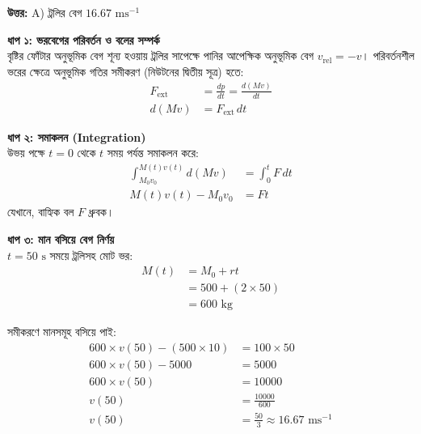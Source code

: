 \documentclass[12pt, a4paper]{article}
\begin{document}
\vspace{0.5em}
\begin{tcolorbox}[answerbox]
    \textbf{\color{success} উত্তর:} A) ট্রলির বেগ $16.67\text{ ms}^{-1}$
\end{tcolorbox}
\vspace{1em}

\begin{tcolorbox}[solutionbox={সমাধান (Solution)}]
    \noindent
    \textbf{ধাপ ১: ভরবেগের পরিবর্তন ও বলের সম্পর্ক} \\
    বৃষ্টির ফোঁটার অনুভূমিক বেগ শূন্য হওয়ায় ট্রলির সাপেক্ষে পানির আপেক্ষিক অনুভূমিক বেগ $v_{\text{rel}} = -v$। পরিবর্তনশীল ভরের ক্ষেত্রে অনুভূমিক গতির সমীকরণ (নিউটনের দ্বিতীয় সূত্র) হতে:
    \begin{align*}
        F_{\text{ext}} &= \frac{dp}{dt} = \frac{d(M v)}{dt} \\
        d(M v) &= F_{\text{ext}} \, dt
    \end{align*}
    
    \vspace{0.5em}
    \noindent\textbf{ধাপ ২: সমাকলন (Integration)} \\
    উভয় পক্ষে $t=0$ থেকে $t$ সময় পর্যন্ত সমাকলন করে:
    \begin{align*}
        \int_{M_0 v_0}^{M(t) v(t)} d(M v) &= \int_0^t F \, dt \\
        M(t) v(t) - M_0 v_0 &= F t
    \end{align*}
    যেখানে, বাহ্যিক বল $F$ ধ্রুবক।
    
    \vspace{0.5em}
    \noindent\textbf{ধাপ ৩: মান বসিয়ে বেগ নির্ণয়} \\
    $t = 50\text{ s}$ সময়ে ট্রলিসহ মোট ভর:
    \begin{align*}
        M(t) &= M_0 + r t \\
             &= 500 + (2 \times 50) \\
             &= 600\text{ kg}
    \end{align*}
    
    সমীকরণে মানসমূহ বসিয়ে পাই:
    \begin{align*}
        600 \times v(50) - (500 \times 10) &= 100 \times 50 \\
        600 \times v(50) - 5000 &= 5000 \\
        600 \times v(50) &= 10000 \\
        v(50) &= \frac{10000}{600} \\
        v(50) &= \frac{50}{3} \approx \mathbf{16.67}\text{ ms}^{-1}
    \end{align*}
\end{tcolorbox}
\end{document}
